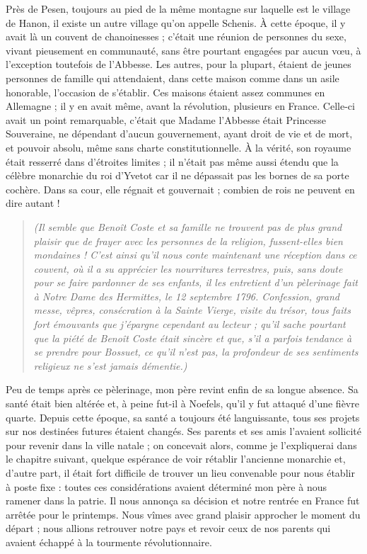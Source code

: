 \documentclass[11pt,a4paper]{report}
\begin{document}
Près de Pesen, toujours au pied de la même montagne sur laquelle est le village de Hanon, il existe un autre village qu'on appelle Schenis. À cette époque, il y avait là un couvent de chanoinesses ; c'était une réunion de personnes du sexe, vivant pieusement en communauté, sans être pourtant engagées par aucun vœu, à l'exception toutefois de l'Abbesse. Les autres, pour la plupart, étaient de jeunes personnes de famille qui attendaient, dans cette maison comme dans un asile honorable, l'occasion de s'établir. Ces maisons étaient assez communes en Allemagne ; il y en avait même, avant la révolution, plusieurs en France. Celle-ci avait un point remarquable, c'était que Madame l'Abbesse était Princesse Souveraine, ne dépendant d'aucun gouvernement, ayant droit de vie et de mort, et pouvoir absolu, même sans charte constitutionnelle. À la vérité, son royaume était resserré dans d'étroites limites ; il n'était pas même aussi étendu que la célèbre monarchie du roi d'Yvetot car il ne dépassait pas les bornes de sa porte cochère. Dans sa cour, elle régnait et gouvernait ; combien de rois ne peuvent en dire autant !

\begin{quote}
\textit{(Il semble que Benoît Coste et sa famille ne trouvent pas de plus grand plaisir que de frayer avec les personnes de la religion, fussent-elles bien mondaines ! C'est ainsi qu'il nous conte maintenant une réception dans ce couvent, où il a su apprécier les nourritures terrestres, puis, sans doute pour se faire pardonner de ses enfants, il les entretient d'un pèlerinage fait à Notre Dame des Hermittes, le 12 septembre 1796. Confession, grand messe, vêpres, consécration à la Sainte Vierge, visite du trésor, tous faits fort émouvants que j'épargne cependant au lecteur ; qu'il sache pourtant que la piété de Benoît Coste était sincère et que, s'il a parfois tendance à se prendre pour Bossuet, ce qu'il n'est pas, la profondeur de ses sentiments religieux ne s'est jamais démentie.)}
\end{quote}

Peu de temps après ce pèlerinage, mon père revint enfin de sa longue absence. Sa santé était bien altérée et, à peine fut-il à Noefels, qu'il y fut attaqué d'une fièvre quarte. Depuis cette époque, sa santé a toujours été languissante, tous ses projets sur nos destinées futures étaient changés. Ses parents et ses amis l'avaient sollicité pour revenir dans la ville natale ; on concevait alors, comme je l'expliquerai dans le chapitre suivant, quelque espérance de voir rétablir l'ancienne monarchie et, d'autre part, il était fort difficile de trouver un lieu convenable pour nous établir à poste fixe : toutes ces considérations avaient déterminé mon père à nous ramener dans la patrie. Il nous annonça sa décision et notre rentrée en France fut arrêtée pour le printemps. Nous vîmes avec grand plaisir approcher le moment du départ ; nous allions retrouver notre pays et revoir ceux de nos parents qui avaient échappé à la tourmente révolutionnaire.
\end{document}
